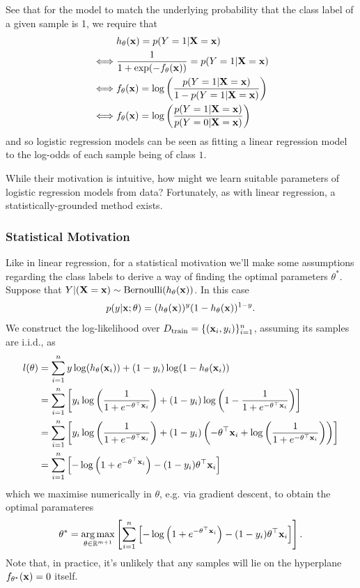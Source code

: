 \documentclass[11pt]{article}
\begin{document}
See that for the model to match the underlying probability that the class label of a given sample is 1, we require that
\begin{align*}
    &h_{\theta}(\mathbf{x})=p(Y=1|\mathbf{X}=\mathbf{x})\\
    \iff & \frac{1}{1+\exp(-f_{\theta}(\mathbf{x}))}=p(Y=1|\mathbf{X}=\mathbf{x})\\
    \iff & f_{\theta}(\mathbf{x}) = \log\left(\frac{p(Y=1|\mathbf{X}=\mathbf{x})}{1-p(Y=1|\mathbf{X}=\mathbf{x})}\right)\\
    \iff & f_{\theta}(\mathbf{x}) = \log\left(\frac{p(Y=1|\mathbf{X}=\mathbf{x})}{p(Y=0|\mathbf{X}=\mathbf{x})}\right)
\end{align*}
and so logistic regression models can be seen as fitting a linear regression model to the log-odds of each sample being of class $1$.

While their motivation is intuitive, how might we learn suitable parameters of logistic regression models from data? Fortunately, as with linear regression, a statistically-grounded method exists.

\subsubsection{Statistical Motivation}
Like in linear regression, for a statistical motivation we'll make some assumptions regarding the class labels to derive a way of finding the optimal parameters $\theta^{*}$. Suppose that $Y|(\mathbf{X}=\mathbf{x})\sim\text{Bernoulli}(h_{\theta}(\mathbf{x}))$. In this case
$$
p(y|\mathbf{x};\theta)=(h_{\theta}(\mathbf{x}))^{y}(1-h_{\theta}(\mathbf{x}))^{1-y}.
$$
We construct the log-likelihood over $D_{\text{train}}=\{(\mathbf{x}_i,y_i)\}_{i=1}^n$, assuming its samples are i.i.d., as
\begin{align*}
    l(\theta)
    &=
    \sum_{i=1}^ny\log(h_{\theta}(\mathbf{x}_i))+(1-y_i)\log(1-h_{\theta}(\mathbf{x}_i))\\
    &=
    \sum_{i=1}^n\left[y_i\log\left(\frac{1}{1+e^{-\theta^{\top}\mathbf{x}_i}}\right)+(1-y_i)\log\left(1-\frac{1}{1+e^{-\theta^{\top}\mathbf{x}_i}}\right)\right]\\
    &=
    \sum_{i=1}^n\left[y_i\log\left(\frac{1}{1+e^{-\theta^{\top}\mathbf{x}_i}}\right)+(1-y_i)\left(-\theta^{\top}\mathbf{x}_i+\log\left(\frac{1}{1+e^{-\theta^{\top}\mathbf{x}_i}}\right)\right)\right]\\
    &=
    \sum_{i=1}^n\left[-\log\left(1+e^{-\theta^{\top}\mathbf{x}_i}\right)-(1-y_i)\theta^{\top}\mathbf{x}_i\right]
\end{align*}
which we maximise numerically in $\theta$, e.g. via gradient descent, to obtain the optimal paramateres
$$
\theta^{*}
=
\operatorname*{arg\,max}_{\theta\in\mathbb{R}^{m+1}}\left[\sum_{i=1}^n\left[-\log\left(1+e^{-\theta^{\top}\mathbf{x}_i}\right)-(1-y_i)\theta^{\top}\mathbf{x}_i\right]\right].
$$
Note that, in practice, it's unlikely that any samples will lie on the hyperplane $f_{\theta^*}(\mathbf{x})=0$ itself.
\end{document}
